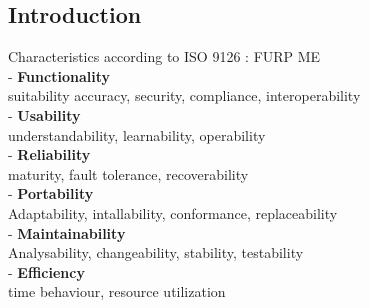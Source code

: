 \subsection{Introduction}
Characteristics according to ISO 9126 : FURP ME\\
- \textbf{Functionality}\\
 suitability accuracy, security, compliance, interoperability\\
- \textbf{Usability}\\
 understandability, learnability, operability\\
- \textbf{Reliability}\\
 maturity, fault tolerance, recoverability\\
- \textbf{Portability}\\
 Adaptability, intallability, conformance, replaceability\\
- \textbf{Maintainability}\\
 Analysability, changeability, stability, testability\\
- \textbf{Efficiency}\\
 time behaviour, resource utilization\\

